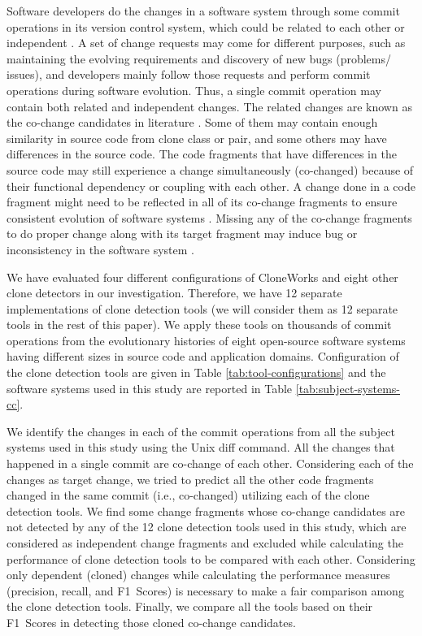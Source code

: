 \documentclass[review]{elsarticle}
\begin{document}
Software developers do the changes in a software system through some commit operations in its version control system, which could be related to each other or independent \cite{Mondal:Co-change-recommendation, Mondal:Connectivity:co-changed}. A set of change requests may come for different purposes, such as maintaining the evolving requirements and discovery of new bugs (problems/ issues), and developers mainly follow those requests and perform commit operations during software evolution. Thus, a single commit operation may contain both related and independent changes.  The related changes are known as the co-change candidates in literature \cite{Mondal-2014-PRC-2597073-2597104rankingCoChange}. Some of them may contain enough similarity in source code from clone class or pair, and some others may have differences in the source code. The code fragments that have differences in the source code may still experience a change simultaneously (co-changed) because of their functional dependency or coupling with each other.  A change done in a code fragment might need to be reflected in all of its co-change fragments to ensure consistent evolution of software systems \cite{Mondal:Association:Rules, Mondal:Context:Adaptation:Bugs}. Missing any of the co-change fragments to do proper change along with its target fragment may induce bug or inconsistency in the software system \cite{Judith:Bug:Replication, Judith:Micro:Regular:Clone}. 

We have evaluated four different configurations of CloneWorks \cite{CloneWorks-Jeff} and eight other clone detectors in our investigation. Therefore, we have 12 separate implementations of clone detection tools (we will consider them as 12 separate tools in the rest of this paper).  We apply these tools on thousands of commit operations from the evolutionary histories of eight open-source software systems having different sizes in source code and application domains. Configuration of the clone detection tools are given in Table \ref{tab:tool-configurations} and the software systems used in this study are reported in Table \ref{tab:subject-systems-cc}.

We identify the changes in each of the commit operations from all the subject systems used in this study using the Unix diff command. All the changes that happened in a single commit are co-change of each other. Considering each of the changes as target change, we tried to predict all the other code fragments changed in the same commit (i.e., co-changed) utilizing each of the clone detection tools. We find some change fragments whose co-change candidates are not detected by any of the 12 clone detection tools used in this study, which are considered as independent change fragments and excluded while calculating the performance of clone detection tools to be compared with each other. Considering only dependent (cloned) changes while calculating the performance measures (precision, recall, and F1~Scores) is necessary to make a fair comparison among the clone detection tools. Finally, we compare all the tools based on their F1~Scores in detecting those cloned co-change candidates.
\end{document}
